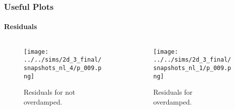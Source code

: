 \documentclass[dvipsnames]{beamer}
\begin{document}
\begin{frame}
    \frametitle{Useful Plots}
    \framesubtitle{Residuals}

    \begin{columns}
        \begin{column}{0.5\textwidth}
            \begin{figure}[t]
                \centering
                \texttt{[image: ../../sims/2d\_3\_final/snapshots\_nl\_4/p\_009.png]}
                \caption{Residuals for not overdamped. }
            \end{figure}
        \end{column}
        \begin{column}{0.5\textwidth}
            \begin{figure}[t]
                \centering
                \texttt{[image: ../../sims/2d\_3\_final/snapshots\_nl\_1/p\_009.png]}
                \caption{Residuals for overdamped.}
            \end{figure}
        \end{column}
    \end{columns}
\end{frame}
\end{document}
